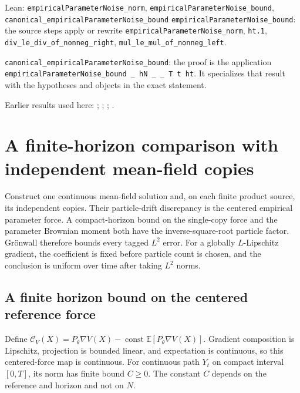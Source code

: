\documentclass[11pt,a4paper]{report}
\begin{document}
\begin{leanbox}{Lean: \texttt{empiricalParameterNoise\_\allowbreak{}norm}, \texttt{empiricalParameterNoise\_\allowbreak{}bound}, \texttt{canonical\_\allowbreak{}empiricalParameterNoise\_\allowbreak{}bound}}
\texttt{empirical\allowbreak{}Parameter\allowbreak{}Noise\_\allowbreak{}bound}: the source steps apply or rewrite \texttt{empirical\allowbreak{}Parameter\allowbreak{}Noise\_\allowbreak{}norm}, \texttt{ht.\allowbreak{}1}, \texttt{div\_\allowbreak{}le\_\allowbreak{}div\_\allowbreak{}of\_\allowbreak{}nonneg\_\allowbreak{}right}, \texttt{mul\_\allowbreak{}le\_\allowbreak{}mul\_\allowbreak{}of\_\allowbreak{}nonneg\_\allowbreak{}left}.



\texttt{canonical\_\allowbreak{}empirical\allowbreak{}Parameter\allowbreak{}Noise\_\allowbreak{}bound}: the proof is the application \texttt{empirical\allowbreak{}Parameter\allowbreak{}Noise\_\allowbreak{}bound \_\allowbreak{} h\allowbreak{}N \_\allowbreak{} \_\allowbreak{} T t ht}. It specializes that result with the hypotheses and objects in the exact statement.
\end{leanbox}


Earlier results used here: \cite[Section~3.25.4]{LangevinLean2026ULASC}; \cite[Section~3.8.17]{LangevinLean2026ULASC}; \cite[Section~3.8.19]{LangevinLean2026ULASC}; \cite[Section~3.8.20]{LangevinLean2026ULASC}.
\section{\texorpdfstring{A finite-horizon comparison with independent mean-field copies}{A finite-horizon comparison with independent mean-field copies}}
\label{proof-module-ProximalLangevin-MeanFieldParticles-lean}


Construct one continuous mean-field solution and, on each finite product source, its independent copies. Their particle-drift discrepancy is the centered empirical parameter force. A compact-horizon bound on the single-copy force and the parameter Brownian moment both have the inverse-square-root particle factor. Grönwall therefore bounds every tagged \(L^2\) error. For a globally \(L\)-Lipschitz gradient, the coefficient is fixed before particle count is chosen, and the conclusion is uniform over time after taking \(L^2\) norms.

\subsection{\texorpdfstring{A finite horizon bound on the centered reference force}{A finite horizon bound on the centered reference force}}
\label{report-step-ProximalLangevin-MeanFieldParticles-lean-1}


Define \(\mathcal C_V(X)=P_\theta\nabla V(X)-\operatorname{const}\mathbb E[P_\theta\nabla V(X)]\). Gradient composition is Lipschitz, projection is bounded linear, and expectation is continuous, so this centered-force map is continuous. For continuous path \(Y_t\) on compact interval \([0,T]\), its norm has finite bound \(C\ge0\). The constant \(C\) depends on the reference and horizon and not on \(N\).
\end{document}
